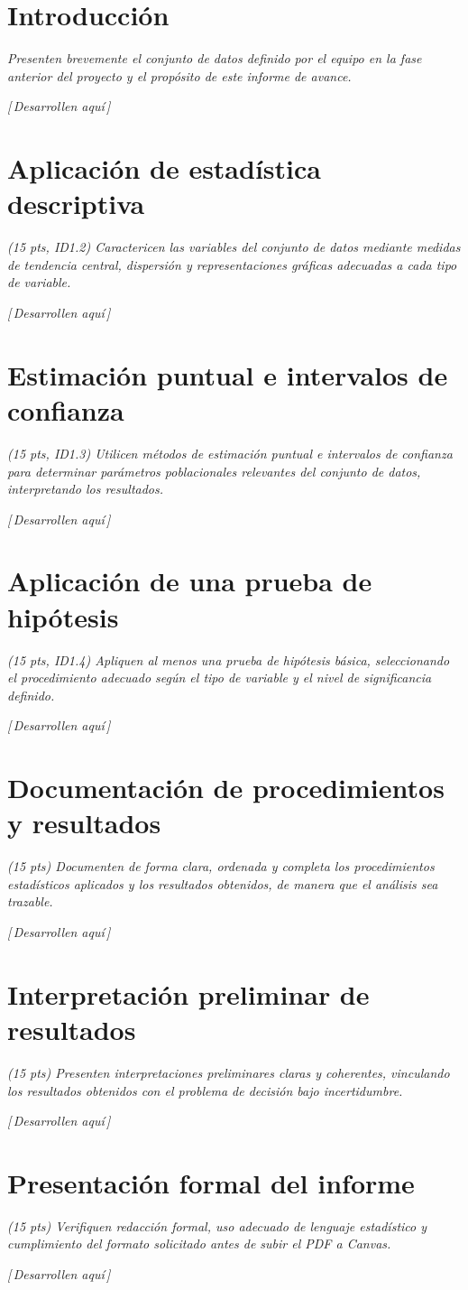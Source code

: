 \documentclass[11pt,a4paper]{article}
\newcommand{\guia}[1]{{\small\itshape\color{gris}#1}\par\vspace{0.15em}}
\newcommand{\resp}{{\footnotesize\itshape\color{fillgray}[\,Desarrollen aquí\,]}\par\vspace{1.1em}}
\begin{document}
\vspace{0.5em}
\tableofcontents
\newpage

\section{Introducción}
\guia{Presenten brevemente el conjunto de datos definido por el equipo en la fase anterior del proyecto y el propósito de este informe de avance.}
\resp

\section{Aplicación de estadística descriptiva}
\guia{(15 pts, ID1.2) Caractericen las variables del conjunto de datos mediante medidas de tendencia central, dispersión y representaciones gráficas adecuadas a cada tipo de variable.}
\resp

\section{Estimación puntual e intervalos de confianza}
\guia{(15 pts, ID1.3) Utilicen métodos de estimación puntual e intervalos de confianza para determinar parámetros poblacionales relevantes del conjunto de datos, interpretando los resultados.}
\resp

\section{Aplicación de una prueba de hipótesis}
\guia{(15 pts, ID1.4) Apliquen al menos una prueba de hipótesis básica, seleccionando el procedimiento adecuado según el tipo de variable y el nivel de significancia definido.}
\resp

\section{Documentación de procedimientos y resultados}
\guia{(15 pts) Documenten de forma clara, ordenada y completa los procedimientos estadísticos aplicados y los resultados obtenidos, de manera que el análisis sea trazable.}
\resp

\section{Interpretación preliminar de resultados}
\guia{(15 pts) Presenten interpretaciones preliminares claras y coherentes, vinculando los resultados obtenidos con el problema de decisión bajo incertidumbre.}
\resp

\section{Presentación formal del informe}
\guia{(15 pts) Verifiquen redacción formal, uso adecuado de lenguaje estadístico y cumplimiento del formato solicitado antes de subir el PDF a Canvas.}
\resp
\end{document}
